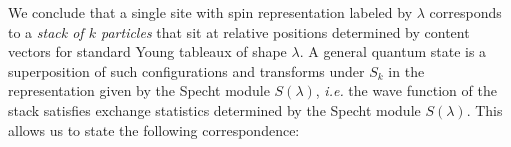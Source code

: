 \documentclass[11pt]{report}
\theoremstyle{definition}
\theoremstyle{remark}
\theoremstyle{remark}
\newcommand{\C}{\mathbb{C}}
\newcommand{\I}{\mathrm{i}}
\begin{document}
We conclude that a single site with spin representation labeled by $\lambda$ corresponds to a \emph{stack of $k$ particles} that sit at relative positions determined by content vectors for standard Young tableaux of shape $\lambda$. A general quantum state is a superposition of such configurations and transforms under $S_k$ in the representation given by the Specht module $S(\lambda)$, \emph{i.e.} the wave function of the stack satisfies exchange statistics determined by the Specht module $S(\lambda)$. This allows us to state the following correspondence:
\end{document}
